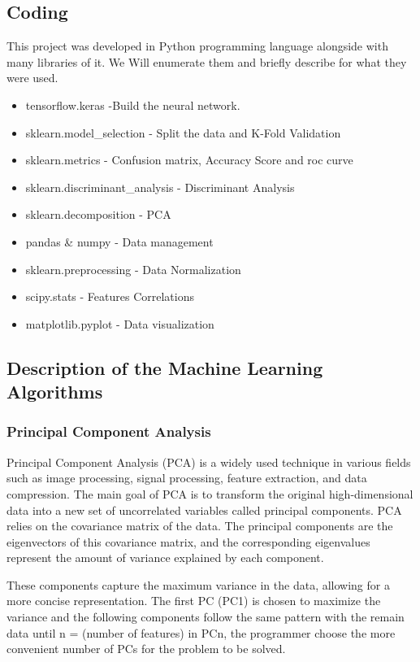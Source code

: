 \documentclass[12pt,a4paper,twocolumn]{article}
\begin{document}
\subsection{Coding}
\par This project was developed in Python programming language alongside with many libraries of it. We Will enumerate them and briefly describe for what they were used.
\begin{itemize}
  \item tensorflow.keras -Build the neural network.
  \item sklearn.model\_selection \cite{sklearn} - Split the data and K-Fold Validation
  \item sklearn.metrics - Confusion matrix, Accuracy Score and roc curve
  \item sklearn.discriminant\_analysis - Discriminant Analysis
  \item sklearn.decomposition - PCA
  \item pandas \& numpy - Data management
  \item sklearn.preprocessing - Data Normalization
  \item scipy.stats - Features Correlations
  \item matplotlib.pyplot - Data visualization
\end{itemize}
\subsection{Description of the Machine Learning Algorithms}
\subsubsection{Principal Component Analysis}
\par Principal Component Analysis (PCA) is a widely used technique in various fields such as image processing, signal processing, feature extraction, and data compression. The main goal of PCA is to transform the original high-dimensional data into a new set of uncorrelated variables called principal components. PCA relies on the covariance matrix of the data. The principal components are the eigenvectors of this covariance matrix, and the corresponding eigenvalues represent the amount of variance explained by each component.

These components capture the maximum variance in the data, allowing for a more concise representation. The first PC (PC1) is chosen to maximize the variance and the following components follow the same pattern with the remain data until n = (number of features) in PCn, the programmer choose the more convenient number of PCs for the problem to be solved.
\end{document}

